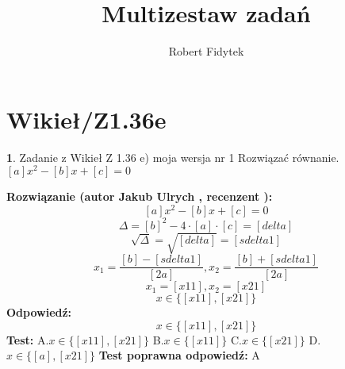 \documentclass[12pt, a4paper]{article}
\title{Multizestaw zadań}
\author{Robert Fidytek}
\date{}
\theoremstyle{definition} %
\newtheorem{zad}{}
\newcommand{\kategoria}[1]{\section{#1}} %
\newcommand{\zadStart}[1]{\begin{zad}#1\newline} %
\newcommand{\zadStop}{\end{zad}}   %
\newcommand{\rozwStart}[2]{\noindent \textbf{Rozwiązanie (autor #1 , recenzent #2): }\newline} %
\newcommand{\rozwStop}{\newline}                                            %
\newcommand{\odpStart}{\noindent \textbf{Odpowiedź:}\newline}    %
\newcommand{\odpStop}{\newline}                                             %
\newcommand{\testStart}{\noindent \textbf{Test:}\newline} %
\newcommand{\testStop}{\newline} %
\newcommand{\kluczStart}{\noindent \textbf{Test poprawna odpowiedź:}\newline} %
\newcommand{\kluczStop}{\newline} %
\begin{document}
\maketitle


\kategoria{Wikieł/Z1.36e}
\zadStart{Zadanie z Wikieł Z 1.36 e) moja wersja nr 1}
Rozwiązać równanie. $[a]x^{2}-[b]x+[c]=0$
\zadStop
\rozwStart{Jakub Ulrych}{}
$$[a]x^{2}-[b]x+[c]=0$$
$$\Delta=[b]^{2}-4\cdot[a]\cdot[c]=[delta]$$
$$\sqrt{\Delta}=\sqrt{[delta]}=[sdelta1]$$
$$x_{1}=\frac{[b]-[sdelta1]}{[2a]},x_{2}=\frac{[b]+[sdelta1]}{[2a]}$$
$$x_{1}=[x11],x_{2}=[x21]$$
$$x\in\{[x11],[x21]\}$$
\rozwStop
\odpStart
$$x\in\{[x11],[x21]\}$$
\odpStop
\testStart
A.$x\in\{[x11],[x21]\}$
B.$x\in\{[x11]\}$
C.$x\in\{[x21]\}$
D.$x\in\{[a],[x21]\}$
\testStop
\kluczStart
A
\kluczStop
\end{document}
